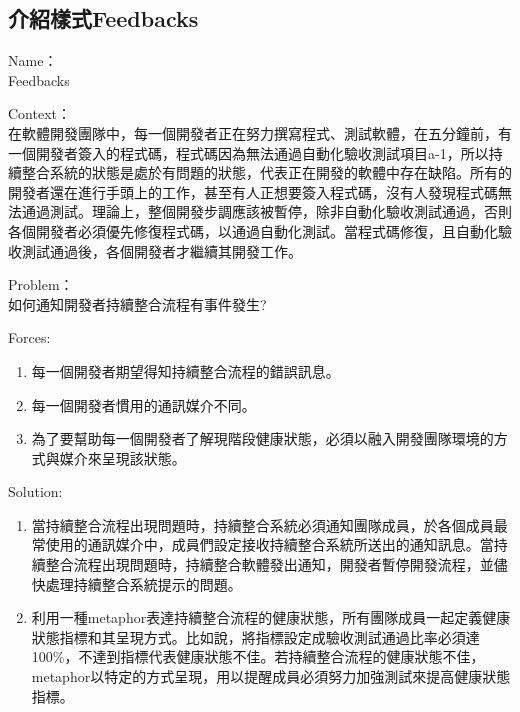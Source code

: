 \subsection{介紹樣式Feedbacks}
\begin{description}
\item Name：\\
Feedbacks 
\item Context：\\
在軟體開發團隊中，每一個開發者正在努力撰寫程式、測試軟體，在五分鐘前，有一個開發者簽入的程式碼，程式碼因為無法通過自動化驗收測試項目a-1，所以持續整合系統的狀態是處於有問題的狀態，代表正在開發的軟體中存在缺陷。所有的開發者還在進行手頭上的工作，甚至有人正想要簽入程式碼，沒有人發現程式碼無法通過測試。理論上，整個開發步調應該被暫停，除非自動化驗收測試通過，否則各個開發者必須優先修復程式碼，以通過自動化測試。當程式碼修復，且自動化驗收測試通過後，各個開發者才繼續其開發工作。
\item Problem：\\
如何通知開發者持續整合流程有事件發生? 
\item Forces: 
\begin{enumerate}
\item 每一個開發者期望得知持續整合流程的錯誤訊息。
\item 每一個開發者慣用的通訊媒介不同。 
\item 為了要幫助每一個開發者了解現階段健康狀態，必須以融入開發團隊環境的方式與媒介來呈現該狀態。 
\end{enumerate}

\item Solution: 
\begin{enumerate}
\item 當持續整合流程出現問題時，持續整合系統必須通知團隊成員\cite{cruisecontrolpublisher}，於各個成員最常使用的通訊媒介中，成員們設定接收持續整合系統所送出的通知訊息。當持續整合流程出現問題時，持續整合軟體發出通知，開發者暫停開發流程，並儘快處理持續整合系統提示的問題。 
\item 利用一種metaphor表達持續整合流程的健康狀態，所有團隊成員一起定義健康狀態指標和其呈現方式。比如說，將指標設定成驗收測試通過比率必須達100\%，不達到指標代表健康狀態不佳。若持續整合流程的健康狀態不佳，metaphor以特定的方式呈現，用以提醒成員必須努力加強測試來提高健康狀態指標。 
\end{enumerate}


\end{description}
